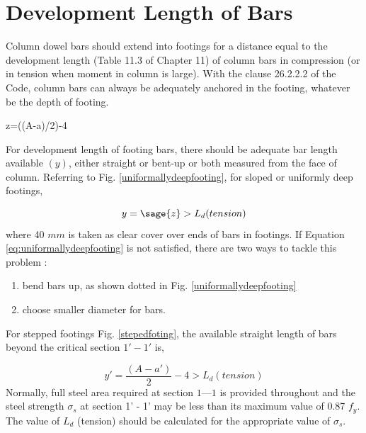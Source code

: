 \documentclass{report}
\newcommand{\figmacro}[1] {Fig. #1}
\newcommand{\equmacro}[1] {Equation #1}
\newcommand{\tablemacro}[1] {Table #1}
\begin{document}
\section{Development Length of Bars}
Column dowel bars should extend into footings for a distance equal to the development
length (\tablemacro 11.3 of Chapter 11) of column bars in compression (or in tension when moment in column is large). With the clause 26.2.2.2 of the Code, column bars can always be adequately anchored in the footing, whatever be the depth of footing. 

\begin{sagesilent}
        z=((A-a)/2)-4                    
\end{sagesilent}

For development length of footing bars, there should be adequate bar length available $(y)$, either straight or bent-up or both measured from the face of column. Referring to \figmacro\ref{uniformallydeepfooting}, for sloped or uniformly deep footings,

\begin{equation} 
        \label{eq:uniformallydeepfooting}
        y= \sage{z} >L_d (tension)
\end{equation}
where 40 $mm$ is taken as clear cover over ends of bars in footings. If \equmacro \ref{eq:uniformallydeepfooting} is not  satisfied, there are two ways to tackle this problem :

\begin{enumerate}
\item bend bars up, as shown dotted in \figmacro \ref{uniformallydeepfooting}
\item choose smaller diameter for bars.
\end{enumerate}

For stepped footings \figmacro \ref{stepedfoting}, the available straight length of bars beyond the critical
section ${1' - 1'}$ is,
                                                          
\begin{equation}                                                           \label{eq:criticalsection1-1}
        y'= \frac{(A-a')}{2}-4 >L_d (tension)                                      
\end{equation}
Normally, full steel area required at section $1 — 1$ is provided throughout and the steel strength $\sigma_s$ at section 1’ - 1’ may be less than its maximum value of 0.87 $f_y$. The value of $L_d$ (tension) should be calculated for the appropriate value of $\sigma_s$.
\end{document}
